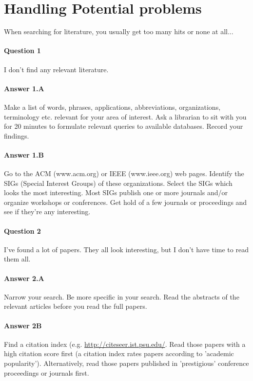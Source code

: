 \documentclass[informationsecurity]{gucmasterproject}
\begin{document}
\section{Handling Potential problems}
When searching for literature, you usually get too many hits or none at all...

\paragraph{Question 1} I don't find any relevant literature.

\paragraph{Answer 1.A}  Make a list of words, phrases, applications, abbreviations,
organizations, terminology etc. relevant for your area of interest.
Ask a librarian to sit with you for 20 minutes to formulate relevant
queries to available databases.  Record your findings.

\paragraph{Answer 1.B}  Go to the ACM (www.acm.org) or IEEE (www.ieee.org) web pages.
Identify the SIGs (Special Interest Groups) of these organizations.
Select the SIGs which looks the most interesting.
Most SIGs publish one or more journals and/or organize workshops or conferences.
Get hold of a few journals or proceedings and see if they're any interesting.


\paragraph{Question 2}  I've found a lot of papers.
They all look interesting, but I don't have time to read them all.

\paragraph{Answer 2.A}  Narrow your search.  Be more specific in your search.  Read the abstracts of the relevant articles before you read the full papers.

\paragraph{Answer 2B}  Find a citation index (e.g. \url{http://citeseer.ist.psu.edu/}.
Read those papers with a high citation score first
(a citation index rates papers according to 'academic popularity').  Alternatively,
read those papers published in 'prestigious' conference proceedings or journals first.
\end{document}
